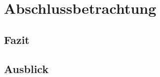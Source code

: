 
\chapter{Abschlussbetrachtung} %
\label{cha:abschlussbetrachtung}

\section{Fazit} %
\label{sec:fazit}


\section{Ausblick} %
\label{sec:ausblick}


